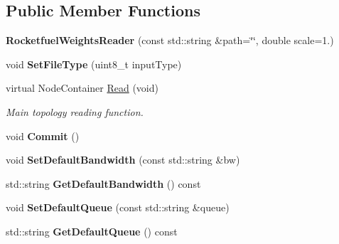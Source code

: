 \subsection*{Public Member Functions}
\begin{DoxyCompactItemize}
\item 
{\bfseries Rocketfuel\+Weights\+Reader} (const std\+::string \&path=\char`\"{}\char`\"{}, double scale=1.)\hypertarget{classns3_1_1RocketfuelWeightsReader_ab611a768529df98b547e219ac62545c0}{}\label{classns3_1_1RocketfuelWeightsReader_ab611a768529df98b547e219ac62545c0}

\item 
void {\bfseries Set\+File\+Type} (uint8\+\_\+t input\+Type)\hypertarget{classns3_1_1RocketfuelWeightsReader_a00dc76ccb95b98ce167042c5d39763c7}{}\label{classns3_1_1RocketfuelWeightsReader_a00dc76ccb95b98ce167042c5d39763c7}

\item 
virtual Node\+Container \hyperlink{classns3_1_1RocketfuelWeightsReader_a920d8786e3a63cca34b5145d92a10c53}{Read} (void)
\begin{DoxyCompactList}\small\item\em Main topology reading function. \end{DoxyCompactList}\item 
void {\bfseries Commit} ()\hypertarget{classns3_1_1RocketfuelWeightsReader_ae37d6f69833dcd8c0e2544834833a531}{}\label{classns3_1_1RocketfuelWeightsReader_ae37d6f69833dcd8c0e2544834833a531}

\item 
void {\bfseries Set\+Default\+Bandwidth} (const std\+::string \&bw)\hypertarget{classns3_1_1RocketfuelWeightsReader_a558dd795cfbaa5226a7bfd6cdd2e2ea2}{}\label{classns3_1_1RocketfuelWeightsReader_a558dd795cfbaa5226a7bfd6cdd2e2ea2}

\item 
std\+::string {\bfseries Get\+Default\+Bandwidth} () const\hypertarget{classns3_1_1RocketfuelWeightsReader_a6dcd7115c69c9b5b49ff3c12f6ff9df6}{}\label{classns3_1_1RocketfuelWeightsReader_a6dcd7115c69c9b5b49ff3c12f6ff9df6}

\item 
void {\bfseries Set\+Default\+Queue} (const std\+::string \&queue)\hypertarget{classns3_1_1RocketfuelWeightsReader_a0d86b60070ed098c3d42d2d075c95591}{}\label{classns3_1_1RocketfuelWeightsReader_a0d86b60070ed098c3d42d2d075c95591}

\item 
std\+::string {\bfseries Get\+Default\+Queue} () const\hypertarget{classns3_1_1RocketfuelWeightsReader_a7ff106a9fa80f262c06ca96dba9eb2e5}{}\label{classns3_1_1RocketfuelWeightsReader_a7ff106a9fa80f262c06ca96dba9eb2e5}

\end{DoxyCompactItemize}
